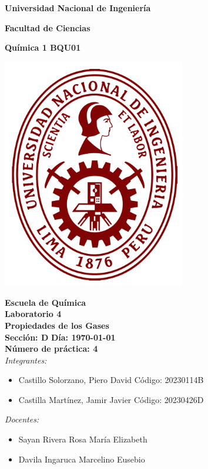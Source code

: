 \documentclass[main.tex]{subfiles}
\begin{document}
\onecolumn

\begin{center}
\textbf{\fontsize{16}{\baselineskip}\selectfont Universidad Nacional de Ingeniería}

\bigskip

\textbf{\fontsize{16}{\baselineskip}\selectfont Facultad de Ciencias}

\bigskip

\textbf{\fontsize{18}{\baselineskip}\selectfont Química 1 BQU01}

\bigskip

\includegraphics[width=8cm]{uni-logo.png}

\textbf{\fontsize{16}{\baselineskip}\selectfont Escuela de Química}
\bigskip \\
\textbf{\fontsize{20}{\baselineskip}\selectfont Laboratorio 4}
\bigskip \\
\textbf{\fontsize{19}{\baselineskip}\selectfont Propiedades de los Gases}
\bigskip \\
\textbf{\fontsize{18}{\baselineskip}\selectfont Sección: D}
\quad \quad
\textbf{\fontsize{18}{\baselineskip}\selectfont Día: \today}
\bigskip \\
\textbf{\fontsize{16}{\baselineskip}\selectfont Número de práctica: 4}
\bigskip \\

\textit{\fontsize{16}{\baselineskip}\selectfont Integrantes:}

\begin{itemize}
    \item \fontsize{16}{\baselineskip}\selectfont Castillo Solorzano, Piero David   \quad Código: 20230114B
    \item \fontsize{16}{\baselineskip}\selectfont Castilla Martínez, Jamir Javier   \quad Código: 20230426D
\end{itemize}

\textit{\fontsize{16}{\baselineskip}\selectfont Docentes:}

\begin{itemize}
    \item \fontsize{16}{\baselineskip}\selectfont Sayan Rivera Rosa María Elizabeth
    \item \fontsize{16}{\baselineskip}\selectfont Davila Ingaruca Marcelino Eusebio
\end{itemize}

\bigskip
\end{center}

\clearpage
\end{document}
